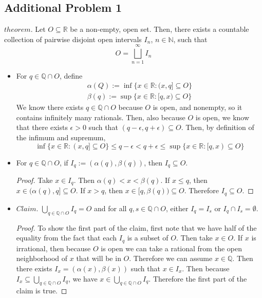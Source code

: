 \documentclass[12pt]{article}
\begin{document}
\subsection*{Additional Problem 1}

$theorem.$ Let $O \subseteq \mathbb{R}$ be a non-empty, open set. Then, there exists a countable collection of pairwise disjoint open intervals $I_n$, $n \in \mathbb{N}$, such that $$O = \bigsqcup_{n=1}^\infty I_n$$

\begin{itemize}
    \item[a.] For $q \in \mathbb{Q} \cap O$, define 
    \begin{align*}
        \alpha(Q) := \inf\{ x \in \mathbb{R} : (x, q] \subseteq O\} \\
        \beta(q) := \sup\{ x \in \mathbb{R} : [q, x) \subseteq O\}
    \end{align*}
    We know there exists $q \in \mathbb{Q} \cap O$ because $O$ is open, and nonempty, so it contains infinitely many rationals. Then, also because $O$ is open, we know that there exists $\epsilon > 0$ such that $(q - \epsilon, q + \epsilon) \subseteq O$. Then, by definition of the infimum and supremum, $$\inf \{ x \in \mathbb{R} : (x,q] \subseteq O\} \leq q-\epsilon < q + \epsilon \leq \sup \{x \in \mathbb{R} : [q,x) \subseteq O\}$$

    \item[b.] For $q \in \mathbb{Q} \cap O$, if $I_q := (\alpha(q), \beta(q))$, then $I_q \subseteq O$.
    
    \begin{proof}
        Take $x \in I_q$. Then $\alpha(q) < x < \beta(q)$. If $x \leq q$, then $x \in (\alpha(q), q] \subseteq O$. If $x > q$, then $x \in [q, \beta (q)) \subseteq O$. Therefore $I_q \subseteq O$.
    \end{proof}

    \item[c.] $Claim.$ $\bigcup_{q \in \mathbb{Q} \cap O} I_q = O$ and for all $q, s \in \mathbb{Q} \cap O$, either $I_q = I_s$ or $I_q \cap I_s = \emptyset$.
    
    \begin{proof}
        To show the first part of the claim, first note that we have half of the equality from the fact that each $I_q$ is a subset of $O$. Then take $x \in O$. If $x$ is irrational, then because $O$ is open we can take a rational from the open neighborhood of $x$ that will be in $O$. Therefore we can assume $x \in \mathbb{Q}$. Then there exists $I_x = (\alpha(x), \beta(x))$ such that $x \in I_x$. Then because $I_x \subseteq \bigcup_{q \in \mathbb{Q} \cap O} I_q$, we have $x \in \bigcup_{q \in \mathbb{Q} \cap O} I_q$. Therefore the first part of the claim is true.


\end{proof}
\end{itemize}
\end{document}
